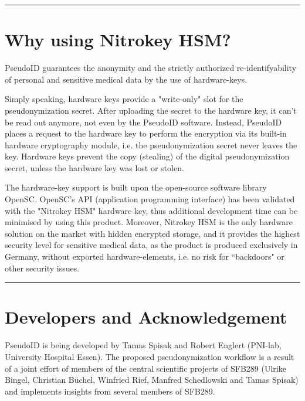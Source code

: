 \par\noindent\rule{\textwidth\color{pniblue}}{0.4pt}
\section{Why using Nitrokey HSM?}
PseudoID guarantees the anonymity and the strictly authorized re-identifyability of personal and sensitive medical data by the use of hardware-keys.

Simply speaking, hardware keys provide a "write-only" slot for the pseudonymization secret. After uploading the secret to the hardware key, it can't be read out anymore, not even by the PseudoID software. Instead, PseudoID places a request to the hardware key to perform the encryption via its built-in hardware cryptography module, i.e. the pseudonymization secret never leaves the key. Hardware keys prevent the copy (stealing) of the digital pseudonymization secret, unless the hardware key was lost or stolen.

The hardware-key support is built upon the open-source software library OpenSC. OpenSC's API (application programming interface) has been validated with the "Nitrokey HSM" hardware key, thus additional development time can be minimised by using this product. Moreover, Nitrokey HSM is the only hardware solution on the market with hidden encrypted storage, and it provides the highest security level for sensitive medical data, as the product is produced exclusively in Germany, without exported hardware-elements, i.e. no risk for “backdoors" or other security issues.


\par\noindent\rule{\textwidth\color{pniblue}}{0.4pt}
\section{Developers and Acknowledgement}
PseudoID is being developed by Tamas Spisak and Robert Englert (PNI-lab, University Hospital Essen). The proposed pseudonymization workflow is a result of a joint effort of members of the central scientific projects of SFB289 (Ulrike Bingel, Christian Büchel, Winfried Rief, Manfred Schedlowski and Tamas Spisak) and implements insights from several members of SFB289.